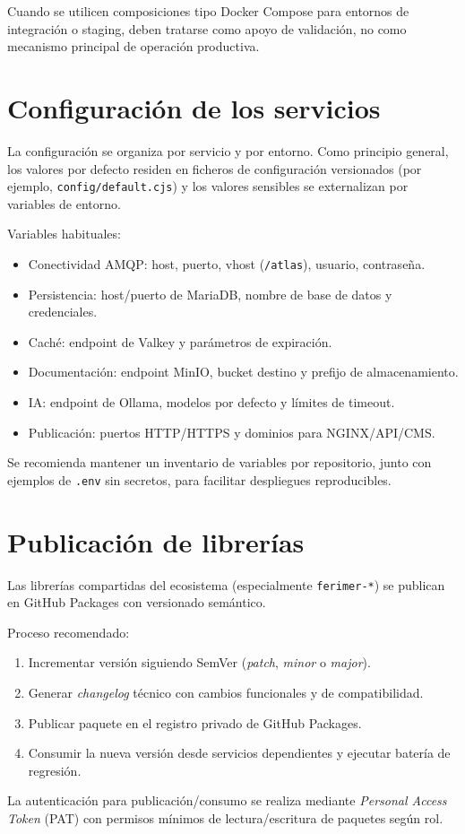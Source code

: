 Cuando se utilicen composiciones tipo Docker Compose para entornos de integración o staging, deben tratarse como apoyo de validación, no como mecanismo principal de operación productiva.

\section{Configuración de los servicios}

La configuración se organiza por servicio y por entorno. Como principio general, los valores por defecto residen en ficheros de configuración versionados (por ejemplo, \texttt{config/default.cjs}) y los valores sensibles se externalizan por variables de entorno.

Variables habituales:

\begin{itemize}
\item Conectividad AMQP: host, puerto, vhost (\texttt{/atlas}), usuario, contraseña.
\item Persistencia: host/puerto de MariaDB, nombre de base de datos y credenciales.
\item Caché: endpoint de Valkey y parámetros de expiración.
\item Documentación: endpoint MinIO, bucket destino y prefijo de almacenamiento.
\item IA: endpoint de Ollama, modelos por defecto y límites de timeout.
\item Publicación: puertos HTTP/HTTPS y dominios para NGINX/API/CMS.
\end{itemize}

Se recomienda mantener un inventario de variables por repositorio, junto con ejemplos de \texttt{.env} sin secretos, para facilitar despliegues reproducibles.

\section{Publicación de librerías}

Las librerías compartidas del ecosistema (especialmente \texttt{ferimer-*}) se publican en GitHub Packages con versionado semántico.

Proceso recomendado:

\begin{enumerate}
\item Incrementar versión siguiendo SemVer (\textit{patch}, \textit{minor} o \textit{major}).
\item Generar \textit{changelog} técnico con cambios funcionales y de compatibilidad.
\item Publicar paquete en el registro privado de GitHub Packages.
\item Consumir la nueva versión desde servicios dependientes y ejecutar batería de regresión.
\end{enumerate}

La autenticación para publicación/consumo se realiza mediante \textit{Personal Access Token} (PAT) con permisos mínimos de lectura/escritura de paquetes según rol.
